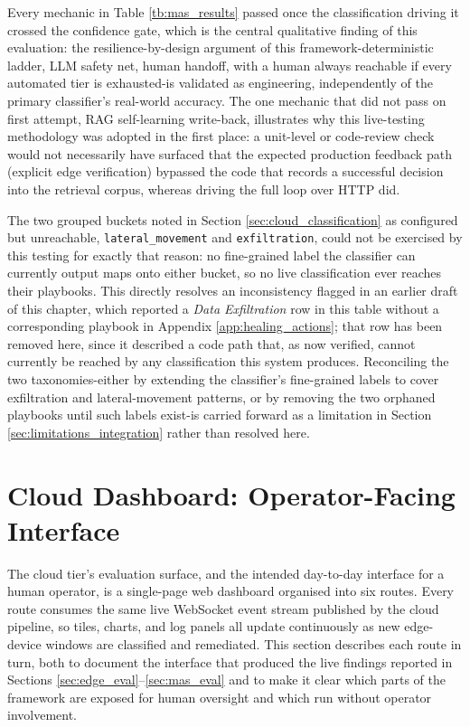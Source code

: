 Every mechanic in Table \ref{tb:mas_results} passed once the classification driving it crossed the confidence gate, which is the central qualitative finding of this evaluation: the resilience-by-design argument of this framework-deterministic ladder, LLM safety net, human handoff, with a human always reachable if every automated tier is exhausted-is validated as engineering, independently of the primary classifier's real-world accuracy. The one mechanic that did not pass on first attempt, RAG self-learning write-back, illustrates why this live-testing methodology was adopted in the first place: a unit-level or code-review check would not necessarily have surfaced that the expected production feedback path (explicit edge verification) bypassed the code that records a successful decision into the retrieval corpus, whereas driving the full loop over HTTP did.

The two grouped buckets noted in Section \ref{sec:cloud_classification} as configured but unreachable, \texttt{lateral\_movement} and \texttt{exfiltration}, could not be exercised by this testing for exactly that reason: no fine-grained label the classifier can currently output maps onto either bucket, so no live classification ever reaches their playbooks. This directly resolves an inconsistency flagged in an earlier draft of this chapter, which reported a \textit{Data Exfiltration} row in this table without a corresponding playbook in Appendix \ref{app:healing_actions}; that row has been removed here, since it described a code path that, as now verified, cannot currently be reached by any classification this system produces. Reconciling the two taxonomies-either by extending the classifier's fine-grained labels to cover exfiltration and lateral-movement patterns, or by removing the two orphaned playbooks until such labels exist-is carried forward as a limitation in Section \ref{sec:limitations_integration} rather than resolved here.

\section{Cloud Dashboard: Operator-Facing Interface}\label{sec:cloud_dashboard}

The cloud tier's evaluation surface, and the intended day-to-day interface for a human operator, is a single-page web dashboard organised into six routes. Every route consumes the same live WebSocket event stream published by the cloud pipeline, so tiles, charts, and log panels all update continuously as new edge-device windows are classified and remediated. This section describes each route in turn, both to document the interface that produced the live findings reported in Sections \ref{sec:edge_eval}--\ref{sec:mas_eval} and to make it clear which parts of the framework are exposed for human oversight and which run without operator involvement.

